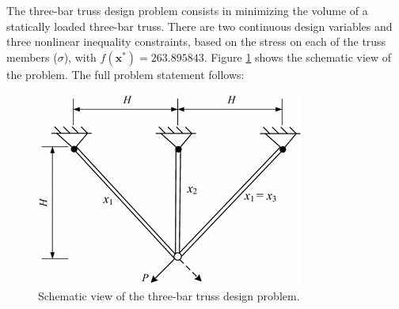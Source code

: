 

The three-bar truss design problem \citep{TB} consists in minimizing the volume of a statically loaded three-bar truss. There are two continuous design variables and three nonlinear inequality constraints, based on the stress on each of the truss members ($\sigma$), with $f(\bm{x}^*) = 263.895843$. Figure \ref{fig:TB} shows the schematic view of the problem. The full problem statement follows:

\vspace{-0.5cm}



\vspace{0.5cm}


\begin{figure}[h]
    \begin{center}
    \includegraphics[scale=0.5]{Imgs/TB.png}
    \end{center}
    \captionsetup{justification=centering}
    \caption{Schematic view of the three-bar truss design problem.}\label{fig:TB}
\end{figure}
